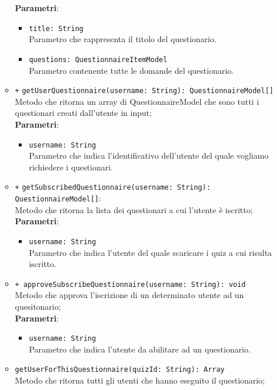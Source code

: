 \begin{itemize}
\begin{itemize}
	\textbf{Parametri}:
	\begin{itemize}
		\item \texttt{title: String} \\ Parametro che rappresenta il titolo del questionario.
		\item \texttt{questions: QuestionnaireItemModel} \\ Parametro contenente tutte le domande del questionario.
	\end{itemize}
	\item \texttt{+} \texttt{getUserQuestionnaire(username: String): QuestionnaireModel[]} \\Metodo che ritorna un array di QuestionnaireModel che sono tutti i questionari creati dall'utente in input;\\
	\textbf{Parametri}:
	\begin{itemize}
		\item \texttt{username: String} \\ Parametro che indica l'identificativo dell'utente del quale vogliamo richiedere i questionari.
	\end{itemize}
	\item \texttt{+} \texttt{getSubscribedQuestionnaire(username: String): QuestionnaireModel[]}: \\Metodo che ritorna la lista dei questionari a cui l'utente è iscritto;\\
	\textbf{Parametri}:
	\begin{itemize}
		\item \texttt{username: String} \\ Parametro che indica l'utente del quale scaricare i quiz a cui risulta iscritto.
	\end{itemize}
	\item \texttt{+ approveSubscribeQuestionnaire(username: String): void} \\ Metodo che approva l'iscrizione di un determinato utente ad un quesitonario; \\
	\textbf{Parametri}:
	\begin{itemize}
		\item \texttt{username: String} \\ Parametro che indica l'utente da abilitare ad un questionario.
	\end{itemize}
	\item \texttt{getUserForThisQuestionnaire(quizId: String): Array} \\ Metodo che ritorna tutti gli utenti che hanno eseguito il questionario; \\

\end{itemize}
\end{itemize}
